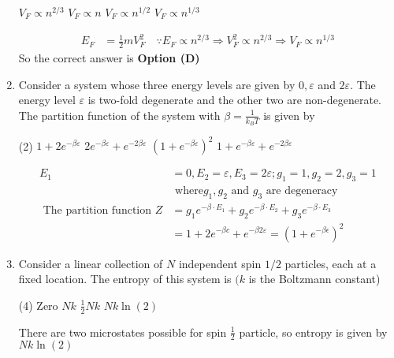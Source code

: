 \begin{enumerate}
\begin{tasks}
\task[\textbf{A.}] $V_{F} \propto n^{2 / 3}$
\task[\textbf{B.}]  $V_{F} \propto n$
\task[\textbf{C.}] $V_{F} \propto n^{1 / 2}$
\task[\textbf{D.}] $V_{F} \propto n^{1 / 3}$
\end{tasks}
\begin{answer}
\begin{align*}
E_{F}&=\frac{1}{2} m V_{F}^{2} \quad \because E_{F} \propto n^{2 / 3} \Rightarrow V_{F}^{2} \propto n^{2 / 3} \Rightarrow V_{F} \propto n^{1 / 3}
\end{align*}
So the correct answer is \textbf{Option (D)}
\end{answer}
	\item Consider a system whose three energy levels are given by $0, \varepsilon$ and $2 \varepsilon$. The energy level $\varepsilon$ is two-fold degenerate and the other two are non-degenerate. The partition function of the system with $\beta=\frac{1}{k_{B} T}$ is given by
\begin{tasks}(2)
\task[\textbf{A.}] $1+2 e^{-\beta \varepsilon}$
\task[\textbf{B.}] $2 e^{-\beta \varepsilon}+e^{-2 \beta \varepsilon}$
\task[\textbf{C.}] $\left(1+e^{-\beta \varepsilon}\right)^{2}$
\task[\textbf{D.}] $1+e^{-\beta \varepsilon}+e^{-2 \beta \varepsilon}$
\end{tasks}
\begin{answer}
\begin{align*}
E_{1}&=0, E_{2}=\varepsilon, E_{3}=2 \varepsilon ; g_{1}=1, g_{2}=2, g_{3}=1\\&\text{ where} g_{1}, g_{2}\text{ and }g_{3}\text{ are degeneracy}\\
\text{	The partition function }Z&=g_{1} e^{-\beta \cdot E_{1}}+g_{2} e^{-\beta \cdot E_{2}}+g_{3} e^{-\beta \cdot E_{3}}\\&=1+2 e^{-\beta c}+e^{-\beta 2 \varepsilon}=\left(1+e^{-\beta \epsilon}\right)^{2}
\end{align*}
\end{answer}
	\item Consider a linear collection of $N$ independent spin $1 / 2$ particles, each at a fixed location. The entropy of this system is $(k$ is the Boltzmann constant)
\begin{tasks}(4)
\task[\textbf{A.}] Zero
\task[\textbf{B.}]  $N k$
\task[\textbf{C.}]  $\frac{1}{2} N k$
\task[\textbf{D.}] $N k \ln (2)$
\end{tasks}
\begin{answer}
There are two microstates possible for spin $\frac{1}{2}$ particle, so entropy is given by $N k \ln (2)$\\\\

\end{answer}
\end{enumerate}
